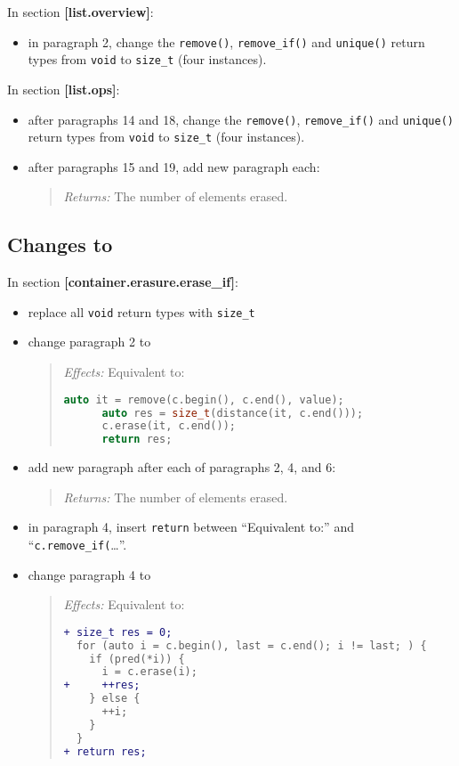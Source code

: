 \documentclass[11pt]{article}
\begin{document}
In section \textbf{[list.overview]}:

\begin{itemize}
\item in paragraph 2, change the \texttt{remove()},
  \texttt{remove\_if()} and \texttt{unique()} return types from
  \texttt{void} to \texttt{size\_t} (four instances).
\end{itemize}

In section \textbf{[list.ops]}:

\begin{itemize}
\item after paragraphs 14 and 18, change the \texttt{remove()},
  \texttt{remove\_if()} and \texttt{unique()} return types from
  \texttt{void} to \texttt{size\_t} (four instances).
\item after paragraphs 15 and 19, add new paragraph each:
  \begin{quotation}
    \textit{Returns:} The number of elements erased.
  \end{quotation}
\end{itemize}

\subsection{Changes to \cite{LFv2TS}}

In section \textbf{[container.erasure.erase\_if]}:

\begin{itemize}
\item replace all \texttt{void} return types with \texttt{size\_t}
\item change paragraph 2 to
  \begin{quotation}
    \textit{Effects:} Equivalent to:
    \begin{lstlisting}[language=C++]
      auto it = remove(c.begin(), c.end(), value);
      auto res = size_t(distance(it, c.end()));
      c.erase(it, c.end());
      return res;
    \end{lstlisting}
  \end{quotation}
\item add new paragraph after each of paragraphs 2, 4, and 6:
  \begin{quotation}
    \textit{Returns:} The number of elements erased.
  \end{quotation}
\item in paragraph 4, insert \texttt{return} between ``Equivalent
  to:'' and ``\texttt{c.remove\_if(}\ldots''.
\item change paragraph 4 to
  \begin{quotation}
    \textit{Effects:} Equivalent to:
    \begin{lstlisting}[language=diff]
+ size_t res = 0;
  for (auto i = c.begin(), last = c.end(); i != last; ) {
    if (pred(*i)) {
      i = c.erase(i);
+     ++res;
    } else {
      ++i;
    }
  }
+ return res;
    \end{lstlisting}
  \end{quotation}
\end{itemize}
\end{document}
